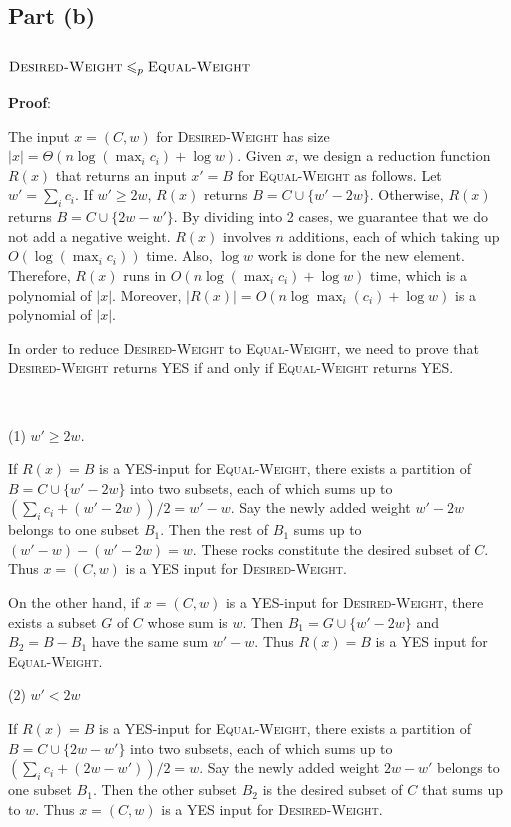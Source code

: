 \documentclass{article}
\begin{document}
\subsection{Part (b)}
\subsubsection{$\textsc{Desired-Weight}\leqslant_p\textsc{Equal-Weight}$}
\noindent\textbf{Proof}:

The input $x=(C,w)$ for \textsc{Desired-Weight} has size $|x|=\Theta(n\log(\max_ic_i)+\log w)$. Given $x$, we design a reduction function $R(x)$ that returns an input $x'=B$ for \textsc{Equal-Weight} as follows. Let $w'=\sum_ic_i$. If $w'\geqslant2w$, $R(x)$ returns $B=C\cup\{w'-2w\}$. Otherwise, $R(x)$ returns $B=C\cup\{2w-w'\}$. By dividing into 2 cases, we guarantee that we do not add a negative weight. $R(x)$ involves $n$ additions, each of which taking up $O(\log(\max_ic_i))$ time. Also, $\log w$ work is done for the new element. Therefore, $R(x)$ runs in $O(n\log(\max_ic_i)+\log w)$ time, which is a polynomial of $|x|$. Moreover, $|R(x)|=O(n\log\max_i(c_i)+\log w)$ is a polynomial of $|x|$.

In order to reduce \textsc{Desired-Weight} to \textsc{Equal-Weight}, we need to prove that \textsc{Desired-Weight} returns YES if and only if \textsc{Equal-Weight} returns YES.

~

\noindent(1) $w'\geqslant2w$.

If $R(x)=B$ is a YES-input for \textsc{Equal-Weight}, there exists a partition of $B=C\cup\{w'-2w\}$ into two subsets, each of which sums up to $(\sum_ic_i+(w'-2w))/2=w'-w$. Say the newly added weight $w'-2w$ belongs to one subset $B_1$. Then the rest of $B_1$ sums up to $(w'-w)-(w'-2w)=w$. These rocks constitute the desired subset of $C$. Thus $x=(C,w)$ is a YES input for \textsc{Desired-Weight}.

On the other hand, if $x=(C,w)$ is a YES-input for \textsc{Desired-Weight}, there exists a subset $G$ of $C$ whose sum is $w$. Then $B_1=G\cup\{w'-2w\}$ and $B_2=B-B_1$ have the same sum $w'-w$. Thus $R(x)=B$ is a YES input for \textsc{Equal-Weight}.

\noindent(2) $w'<2w$

If $R(x)=B$ is a YES-input for \textsc{Equal-Weight}, there exists a partition of $B=C\cup\{2w-w'\}$ into two subsets, each of which sums up to $(\sum_ic_i+(2w-w'))/2=w$. Say the newly added weight $2w-w'$ belongs to one subset $B_1$. Then the other subset $B_2$ is the desired subset of $C$ that sums up to $w$. Thus $x=(C,w)$ is a YES input for \textsc{Desired-Weight}.
\end{document}
